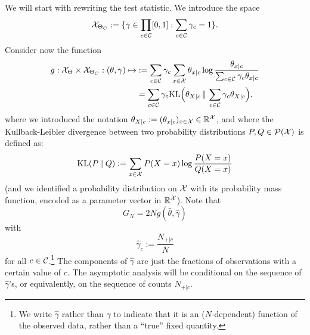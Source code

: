We will start with rewriting the test statistic. We introduce the space
$$\mathcal{X}_{\Theta_C} := \{ \gamma \in \prod_{c\in\mathcal{C}} [0,1] : \sum_{c\in\mathcal{C}} \gamma_c = 1 \}.$$
Consider now the function
\begin{equation}\label{eq:G_test_statistics_limit}
  \begin{split}
    g : \mathcal{X}_\Theta \times \mathcal{X}_{\Theta_C} : (\theta,\gamma) \mapsto
    &:= \sum_{c\in\mathcal{C}} \gamma_c \sum_{x\in\mathcal{X}} \theta_{x|c} \log \frac{\theta_{x|c}}{\sum_{c\in\mathcal{C}} \gamma_c \theta_{x|c}} \\
    & = \sum_{c\in\mathcal{C}} \gamma_c \mathrm{KL}\Big(\theta_{X|c} \,\Vert\, \sum_{c\in\mathcal{C}} \gamma_c \theta_{X|c}\Big),
\end{split}\end{equation}
where we introduced the notation $\theta_{X|c} := (\theta_{x|c})_{x\in\mathcal{X}} \in \mathbb{R}^{\mathcal{X}}$, and where
the Kullback-Leibler divergence between two probability distributions $P,Q \in \mathcal{P}(\mathcal{X})$ is defined as:
$$\mathrm{KL}(P \,\Vert\, Q) := \sum_{x\in\mathcal{X}} P(X=x) \log \frac{P(X=x)}{Q(X=x)}$$
(and we identified a probability distribution on $\mathcal{X}$ with its probability mass function, encoded as a parameter vector in 
$\mathbb{R}^{\mathcal{X}}$).
Note that
$$G_N = 2 N g(\hat\theta, \hat\gamma)$$
with
$$\hat\gamma_c := \frac{N_{+|c}}{N}$$
for all $c\in\mathcal{C}$.\footnote{We write $\hat\gamma$ rather than $\gamma$ to indicate that it is an ($N$-dependent) function of the observed data, rather than a ``true'' fixed quantity.}
The components of $\hat\gamma$ are just the fractions of observations with a certain value of $c$. 
The asymptotic analysis will be conditional on the sequence of $\hat\gamma$'s, or equivalently,
on the sequence of counts $N_{+|c}$.

